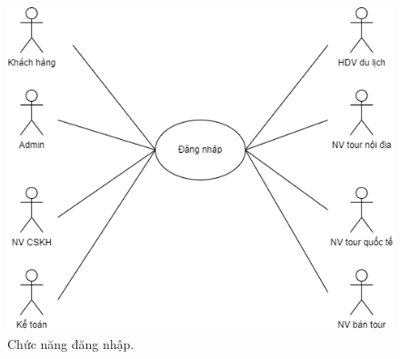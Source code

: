 \begin{figure}[ht]
    \centering
    \includegraphics[width = 1.15\linewidth]{figures/Sub-UseCase-Đăng nhập.png}
    \caption{Chức năng đăng nhập.}
    \label{fig:example_1}
\end{figure}

\vspace{10cm}

